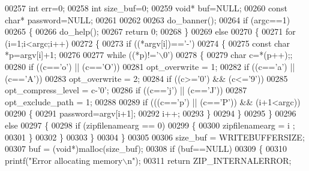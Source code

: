 \begin{DoxyCode}
{{{00257     \textcolor{keywordtype}{int} err=0;
00258     \textcolor{keywordtype}{int} size\_buf=0;
00259     \textcolor{keywordtype}{void}* buf=NULL;
00260     \textcolor{keyword}{const} \textcolor{keywordtype}{char}* password=NULL;
00261 
00262 
00263     do\_banner();
00264     \textcolor{keywordflow}{if} (argc==1)
00265     \{
00266         do\_help();
00267         \textcolor{keywordflow}{return} 0;
00268     \}
00269     \textcolor{keywordflow}{else}
00270     \{
00271         \textcolor{keywordflow}{for} (i=1;i<argc;i++)
00272         \{
00273             \textcolor{keywordflow}{if} ((*argv[i])==\textcolor{charliteral}{'-'})
00274             \{
00275                 \textcolor{keyword}{const} \textcolor{keywordtype}{char} *p=argv[i]+1;
00276 
00277                 \textcolor{keywordflow}{while} ((*p)!=\textcolor{charliteral}{'\(\backslash\)0'})
00278                 \{
00279                     \textcolor{keywordtype}{char} c=*(p++);;
00280                     \textcolor{keywordflow}{if} ((c==\textcolor{charliteral}{'o'}) || (c==\textcolor{charliteral}{'O'}))
00281                         opt\_overwrite = 1;
00282                     \textcolor{keywordflow}{if} ((c==\textcolor{charliteral}{'a'}) || (c==\textcolor{charliteral}{'A'}))
00283                         opt\_overwrite = 2;
00284                     \textcolor{keywordflow}{if} ((c>=\textcolor{charliteral}{'0'}) && (c<=\textcolor{charliteral}{'9'}))
00285                         opt\_compress\_level = c-\textcolor{charliteral}{'0'};
00286                     \textcolor{keywordflow}{if} ((c==\textcolor{charliteral}{'j'}) || (c==\textcolor{charliteral}{'J'}))
00287                         opt\_exclude\_path = 1;
00288 
00289                     \textcolor{keywordflow}{if} (((c==\textcolor{charliteral}{'p'}) || (c==\textcolor{charliteral}{'P'})) && (i+1<argc))
00290                     \{
00291                         password=argv[i+1];
00292                         i++;
00293                     \}
00294                 \}
00295             \}
00296             \textcolor{keywordflow}{else}
00297             \{
00298                 \textcolor{keywordflow}{if} (zipfilenamearg == 0)
00299                 \{
00300                     zipfilenamearg = i ;
00301                 \}
00302             \}
00303         \}
00304     \}
00305 
00306     size\_buf = WRITEBUFFERSIZE;
00307     buf = (\textcolor{keywordtype}{void}*)malloc(size\_buf);
00308     \textcolor{keywordflow}{if} (buf==NULL)
00309     \{
00310         printf(\textcolor{stringliteral}{"Error allocating memory\(\backslash\)n"});
00311         \textcolor{keywordflow}{return} ZIP\_INTERNALERROR;
}}}
\end{DoxyCode}
